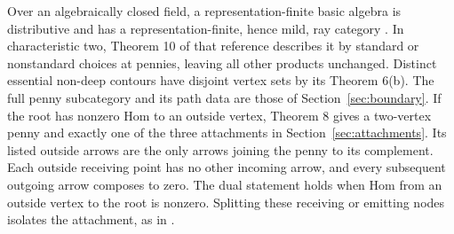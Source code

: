 Over an algebraically closed field, a representation-finite basic algebra is distributive and has a representation-finite, hence mild, ray category \cite[Theorems 2 and 4]{Bongartz13}. In characteristic two, Theorem 10 of that reference describes it by standard or nonstandard choices at pennies, leaving all other products unchanged. Distinct essential non-deep contours have disjoint vertex sets by its Theorem 6(b). The full penny subcategory and its path data are those of Section~\ref{sec:boundary}. If the root has nonzero Hom to an outside vertex, Theorem 8 gives a two-vertex penny and exactly one of the three attachments in Section~\ref{sec:attachments}. Its listed outside arrows are the only arrows joining the penny to its complement. Each outside receiving point has no other incoming arrow, and every subsequent outgoing arrow composes to zero. The dual statement holds when Hom from an outside vertex to the root is nonzero. Splitting these receiving or emitting nodes isolates the attachment, as in \cite[\S3.8]{Bongartz13}.

